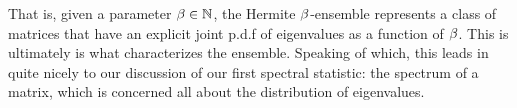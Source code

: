 That is, given a parameter $\beta \in \mathbb{N}$, the Hermite $\beta$-ensemble represents a class of matrices that have an explicit joint p.d.f of eigenvalues as a function of $\beta$.
This is ultimately is what characterizes the ensemble. Speaking of which, this leads in quite nicely to our discussion of our first spectral statistic: the spectrum of a matrix, which is concerned
all about the distribution of eigenvalues.



\begin{center}
  \Ddisttable
\end{center}
